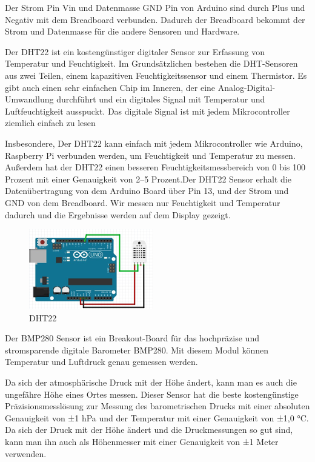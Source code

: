 \documentclass[conference]{IEEEtran}
\begin{document}
Der Strom Pin Vin und Datenmasse GND Pin von Arduino sind durch Plus und Negativ mit dem Breadboard verbunden. Dadurch der Breadboard bekommt der Strom und Datenmasse für die andere Sensoren und Hardware.   

Der DHT22 ist ein kostengünstiger digitaler Sensor zur Erfassung von Temperatur und Feuchtigkeit. Im Grundsätzlichen bestehen die DHT-Sensoren aus zwei Teilen, einem kapazitiven Feuchtigkeitssensor und einem Thermistor. Es gibt auch einen sehr einfachen Chip im Inneren, der eine Analog-Digital-Umwandlung durchführt und ein digitales Signal mit Temperatur und Luftfeuchtigkeit ausspuckt. Das digitale Signal ist mit jedem Mikrocontroller ziemlich einfach zu lesen

Insbesondere, Der DHT22 kann einfach mit jedem Mikrocontroller wie Arduino, Raspberry Pi verbunden werden, um Feuchtigkeit und Temperatur zu messen. Außerdem hat der DHT22 einen besseren Feuchtigkeitsmessbereich von 0 bis 100 Prozent mit einer Genauigkeit von 2–5 Prozent.Der DHT22 Sensor erhalt die Datenübertragung von dem Arduino Board über Pin 13, und der Strom und GND von dem Breadboard.  Wir messen nur Feuchtigkeit und Temperatur dadurch und die Ergebnisse werden auf dem Display gezeigt. 


\begin{figure}
	\centering
	\includegraphics[width=0.7\linewidth]{fig27}
	\caption{DHT22}
	\label{fig:fig27}
\end{figure}




Der  BMP280 Sensor ist ein Breakout-Board für das hochpräzise und stromsparende digitale Barometer BMP280. Mit diesem Modul können Temperatur und Luftdruck genau gemessen werden. 

Da sich der atmosphärische Druck mit der Höhe ändert, kann man es auch die ungefähre Höhe eines Ortes messen.
Dieser Sensor hat die beste kostengünstige Präzisionsmesslösung zur Messung des barometrischen Drucks mit einer absoluten Genauigkeit von ±1 hPa und der Temperatur mit einer Genauigkeit von ±1,0 °C. Da sich der Druck mit der Höhe ändert und die Druckmessungen so gut sind, kann man ihn auch als Höhenmesser mit einer Genauigkeit von ±1 Meter verwenden.
\end{document}
